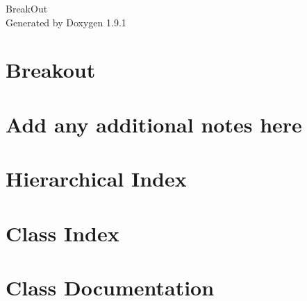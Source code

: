 \let\mypdfximage\pdfximage\def\pdfximage{\immediate\mypdfximage}\documentclass[twoside]{book}
\newcommand{\+}{\discretionary{\mbox{\scriptsize$\hookleftarrow$}}{}{}}
\newcommand{\clearemptydoublepage}{%
  \newpage{\pagestyle{empty}\cleardoublepage}%
}
\begin{document}
\raggedbottom

\hypersetup{pageanchor=false,
             bookmarksnumbered=true,
             pdfencoding=unicode
            }
\begin{titlepage}
\vspace*{7cm}
\begin{center}%
{\Large Break\+Out }\\
\vspace*{1cm}
{\large Generated by Doxygen 1.9.1}\\
\end{center}
\end{titlepage}
\clearemptydoublepage
{}
\tableofcontents
\clearemptydoublepage
{}
\hypersetup{pageanchor=true}

\chapter{Breakout}
\label{index}\hypertarget{index}{}
\chapter{Add any additional notes here}
\label{md__r_e_a_d_m_e}

\chapter{Hierarchical Index}

\chapter{Class Index}

\chapter{Class Documentation}










\backmatter
\newpage
{}
\clearemptydoublepage
{}
\printindex
\end{document}
